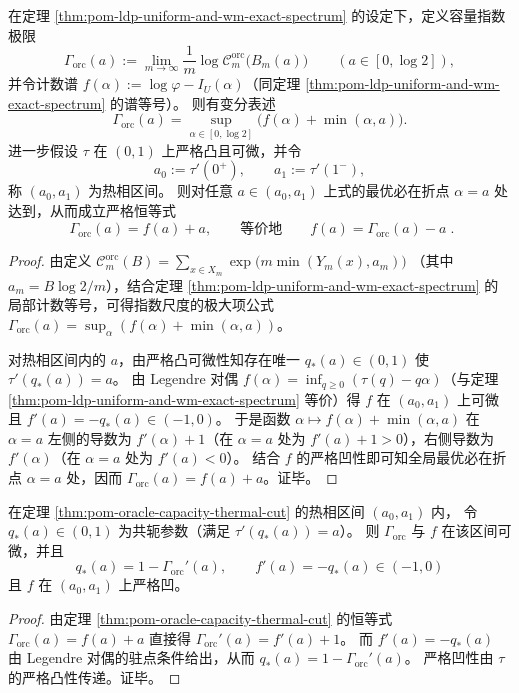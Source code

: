 \begin{theorem}[热相切割恒等式：容量指数在 \texorpdfstring{$(a_0,a_1)$}{(a0,a1)} 上由单层 \texorpdfstring{$\alpha=a$}{alpha=a} 主导]\label{thm:pom-oracle-capacity-thermal-cut}
在定理 \ref{thm:pom-ldp-uniform-and-wm-exact-spectrum} 的设定下，定义容量指数极限
\[
\Gamma_{\mathrm{orc}}(a):=\lim_{m\to\infty}\frac{1}{m}\log \mathcal{C}^{\mathrm{orc}}_m\bigl(B_m(a)\bigr)
\qquad (a\in[0,\log 2]),
\]
并令计数谱 \(f(\alpha):=\log\varphi-I_U(\alpha)\)（同定理 \ref{thm:pom-ldp-uniform-and-wm-exact-spectrum} 的谱等号）。
则有变分表述
\[
\Gamma_{\mathrm{orc}}(a)=\sup_{\alpha\in[0,\log 2]}\bigl(f(\alpha)+\min(\alpha,a)\bigr).
\]
进一步假设 \(\tau\) 在 \((0,1)\) 上严格凸且可微，并令
\[
a_0:=\tau'(0^+),\qquad a_1:=\tau'(1^-),
\]
称 \((a_0,a_1)\) 为热相区间。
则对任意 \(a\in(a_0,a_1)\) 上式的最优必在折点 \(\alpha=a\) 处达到，从而成立严格恒等式
\[
\boxed{\;
\Gamma_{\mathrm{orc}}(a)=f(a)+a,
\qquad\text{等价地}\qquad
f(a)=\Gamma_{\mathrm{orc}}(a)-a\; } .
\]
\end{theorem}
\begin{proof}
由定义
\(
\mathcal{C}^{\mathrm{orc}}_m(B)=\sum_{x\in X_m} \exp\!\bigl(m\min(Y_m(x),a_m)\bigr)
\)
（其中 \(a_m=B\log2/m\)），结合定理 \ref{thm:pom-ldp-uniform-and-wm-exact-spectrum} 的局部计数等号，可得指数尺度的极大项公式
\(
\Gamma_{\mathrm{orc}}(a)=\sup_\alpha(f(\alpha)+\min(\alpha,a))
\)。
\par
对热相区间内的 \(a\)，由严格凸可微性知存在唯一 \(q_*(a)\in(0,1)\) 使 \(\tau'(q_*(a))=a\)。
由 Legendre 对偶 \(f(\alpha)=\inf_{q\ge 0}(\tau(q)-q\alpha)\)（与定理 \ref{thm:pom-ldp-uniform-and-wm-exact-spectrum} 等价）得 \(f\) 在 \((a_0,a_1)\) 上可微且
\(f'(a)=-q_*(a)\in(-1,0)\)。
于是函数 \(\alpha\mapsto f(\alpha)+\min(\alpha,a)\) 在 \(\alpha=a\) 左侧的导数为 \(f'(\alpha)+1\)（在 \(\alpha=a\) 处为 \(f'(a)+1>0\)），右侧导数为 \(f'(\alpha)\)（在 \(\alpha=a\) 处为 \(f'(a)<0\)）。
结合 \(f\) 的严格凹性即可知全局最优必在折点 \(\alpha=a\) 处，因而 \(\Gamma_{\mathrm{orc}}(a)=f(a)+a\)。证毕。
\end{proof}

\begin{corollary}[斜率识别与共轭参数读出：\texorpdfstring{$q_*(a)=1-\Gamma'_{\mathrm{orc}}(a)$}{q*=1-Gamma'}]\label{cor:pom-oracle-capacity-slope-readout}
在定理 \ref{thm:pom-oracle-capacity-thermal-cut} 的热相区间 \((a_0,a_1)\) 内，
令 \(q_*(a)\in(0,1)\) 为共轭参数（满足 \(\tau'(q_*(a))=a\)）。
则 \(\Gamma_{\mathrm{orc}}\) 与 \(f\) 在该区间可微，并且
\[
\boxed{\;
q_*(a)=1-\Gamma_{\mathrm{orc}}'(a),
\qquad
f'(a)=-q_*(a)\in(-1,0)\;}
\]
且 \(f\) 在 \((a_0,a_1)\) 上严格凹。
\end{corollary}
\begin{proof}
由定理 \ref{thm:pom-oracle-capacity-thermal-cut} 的恒等式 \(\Gamma_{\mathrm{orc}}(a)=f(a)+a\) 直接得
\(
\Gamma_{\mathrm{orc}}'(a)=f'(a)+1
\)。
而 \(f'(a)=-q_*(a)\) 由 Legendre 对偶的驻点条件给出，从而 \(q_*(a)=1-\Gamma_{\mathrm{orc}}'(a)\)。
严格凹性由 \(\tau\) 的严格凸性传递。证毕。
\end{proof}


